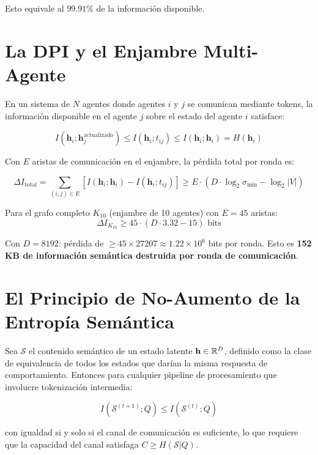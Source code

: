 Esto equivale al $99.91\%$ de la información disponible.

\section{La DPI y el Enjambre Multi-Agente}

En un sistema de $N$ agentes donde agentes $i$ y $j$ se comunican mediante
tokens, la información disponible en el agente $j$ sobre el estado del agente $i$
satisface:

\begin{equation}
I(\mathbf{h}_i; \mathbf{h}_j^{\text{actualizado}}) \le I(\mathbf{h}_i; t_{ij}) \le I(\mathbf{h}_i; \mathbf{h}_i) = H(\mathbf{h}_i)
\end{equation}

Con $E$ aristas de comunicación en el enjambre, la pérdida total por ronda es:

\begin{equation}
\Delta I_{\text{total}} = \sum_{(i,j) \in E} \left[I(\mathbf{h}_i; \mathbf{h}_i) - I(\mathbf{h}_i; t_{ij})\right]
\ge E \cdot (D \cdot \log_2 \sigma_{\min} - \log_2 |V|)
\end{equation}

Para el grafo completo $K_{10}$ (enjambre de 10 agentes) con $E = 45$ aristas:
\begin{equation}
\Delta I_{K_{10}} \ge 45 \cdot (D \cdot 3.32 - 15) \text{ bits}
\end{equation}

Con $D = 8192$: pérdida de $\ge 45 \times 27207 \approx 1.22 \times 10^6$ bits por ronda.
Esto es \textbf{152 KB de información semántica destruida por ronda de comunicación}.

\section{El Principio de No-Aumento de la Entropía Semántica}

\begin{theorem}
\label{thm:no_aumento}
Sea $\mathcal{S}$ el contenido semántico de un estado latente $\mathbf{h} \in \mathbb{R}^D$,
definido como la clase de equivalencia de todos los estados que darían la misma
respuesta de comportamiento. Entonces para cualquier pipeline de procesamiento
que involucre tokenización intermedia:

\begin{equation}
I(\mathcal{S}^{(t+1)}; Q) \le I(\mathcal{S}^{(t)}; Q)
\end{equation}

con igualdad si y solo si el canal de comunicación es suficiente, lo que requiere
que la capacidad del canal satisfaga $C \ge H(\mathcal{S} | Q)$.
\end{theorem}

